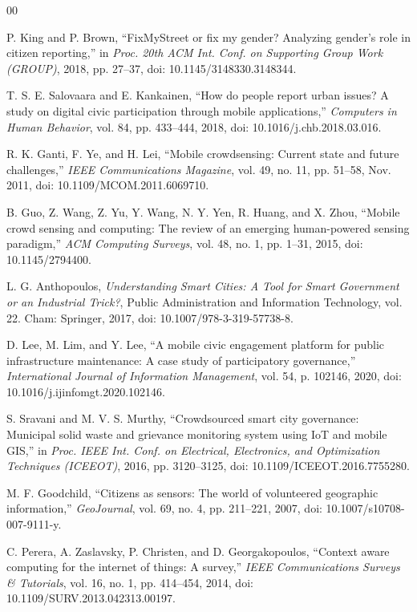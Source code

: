 \documentclass[conference]{IEEEtran}
\begin{document}
\begin{thebibliography}{00}

P. King and P. Brown, ``FixMyStreet or fix my gender? Analyzing gender's role in citizen reporting,'' in \textit{Proc. 20th ACM Int. Conf. on Supporting Group Work (GROUP)}, 2018, pp. 27--37, doi: 10.1145/3148330.3148344.

T. S. E. Salovaara and E. Kankainen, ``How do people report urban issues? A study on digital civic participation through mobile applications,'' \textit{Computers in Human Behavior}, vol. 84, pp. 433--444, 2018, doi: 10.1016/j.chb.2018.03.016.

R. K. Ganti, F. Ye, and H. Lei, ``Mobile crowdsensing: Current state and future challenges,'' \textit{IEEE Communications Magazine}, vol. 49, no. 11, pp. 51--58, Nov. 2011, doi: 10.1109/MCOM.2011.6069710.

B. Guo, Z. Wang, Z. Yu, Y. Wang, N. Y. Yen, R. Huang, and X. Zhou, ``Mobile crowd sensing and computing: The review of an emerging human-powered sensing paradigm,'' \textit{ACM Computing Surveys}, vol. 48, no. 1, pp. 1--31, 2015, doi: 10.1145/2794400.

L. G. Anthopoulos, \textit{Understanding Smart Cities: A Tool for Smart Government or an Industrial Trick?}, Public Administration and Information Technology, vol. 22. Cham: Springer, 2017, doi: 10.1007/978-3-319-57738-8.

D. Lee, M. Lim, and Y. Lee, ``A mobile civic engagement platform for public infrastructure maintenance: A case study of participatory governance,'' \textit{International Journal of Information Management}, vol. 54, p. 102146, 2020, doi: 10.1016/j.ijinfomgt.2020.102146.

S. Sravani and M. V. S. Murthy, ``Crowdsourced smart city governance: Municipal solid waste and grievance monitoring system using IoT and mobile GIS,'' in \textit{Proc. IEEE Int. Conf. on Electrical, Electronics, and Optimization Techniques (ICEEOT)}, 2016, pp. 3120--3125, doi: 10.1109/ICEEOT.2016.7755280.

M. F. Goodchild, ``Citizens as sensors: The world of volunteered geographic information,'' \textit{GeoJournal}, vol. 69, no. 4, pp. 211--221, 2007, doi: 10.1007/s10708-007-9111-y.

C. Perera, A. Zaslavsky, P. Christen, and D. Georgakopoulos, ``Context aware computing for the internet of things: A survey,'' \textit{IEEE Communications Surveys \& Tutorials}, vol. 16, no. 1, pp. 414--454, 2014, doi: 10.1109/SURV.2013.042313.00197.


\end{thebibliography}
\end{document}
